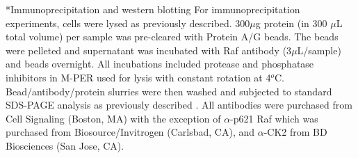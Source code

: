 \documentclass[12pt]{article}
\makeatletter
\renewcommand\subsubsection{\@startsection
	{subsubsection}{2}{0mm}
	{-0.05in}
	{-0.5\baselineskip}
	{\normalfont\normalsize\itshape}}
\makeatother
\begin{document}
\subsubsection*{Immunoprecipitation and western blotting}
For immunoprecipitation experiments, cells were lysed as previously described.
300$\mu$g protein (in 300 $\mu$L total volume) per sample was pre-cleared with Protein A/G beads.
The beads were pelleted and supernatant was incubated with Raf antibody (3$\mu$L/sample) and beads overnight.
All incubations included protease and phosphatase inhibitors in M-PER used for lysis with constant rotation at 4$^{o}$C.
Bead/antibody/protein slurries were then washed and subjected to standard SDS-PAGE analysis as previously described \cite{Shen:2009aa}.
All antibodies were purchased from Cell Signaling (Boston, MA) with the exception of $\alpha$-p621 Raf which was purchased from Biosource/Invitrogen (Carlsbad, CA),
and $\alpha$-CK2 from BD Biosciences (San Jose, CA).


\end{document}
